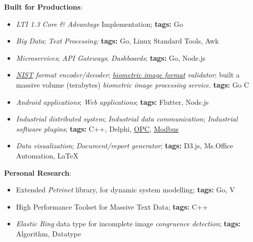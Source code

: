 \documentclass[12pt]{res} %
\begin{document}
\begin{resume}
\begin{multicols}{2}
	\vspace{8pt} %
	\textbf{Built for Productions}:
	\begin{itemize}
		\item \emph{LTI 1.3 Core \& Advantage} Implementation; 
		{\footnotesize \textbf{tags:} Go}
		\item \emph{Big Data}; \emph{Text Processing;}
		{\footnotesize \textbf{tags:} Go, Linux Standard Tools, Awk}
		\item \emph{Microservices}; \emph{API Gateways}; \emph{Dashboards};
		{\footnotesize \textbf{tags:} Go, Node.js}
		\item \emph{\href{https://www.nist.gov/services-resources/software/nist-biometric-image-software-nbis}{NIST} format encoder/decoder}; \emph{\href{https://www.nist.gov/system/files/documents/itl/ansi/sp500-245-a16.pdf} {biometric image format} validator}; built a massive volume (terabytes) \emph{biometric image processing service}. {\footnotesize \textbf{tags:} Go C}
		\item \emph{Android applications}; \emph{Web applications};
		{\footnotesize \textbf{tags:} Flutter, Node.js}
		\item \emph{Industrial distributed system}; \emph{Industrial data communication}; \emph{Industrial software plugins};
		{\footnotesize \textbf{tags:} C++, Delphi, \href{https://opcfoundation.org}{OPC}, \href{https://modbus.org}{Modbus}}
		\item \emph{Data visualization}; \emph{Document/report generator};
		{\footnotesize \textbf{tags:} D3.js}, Ms.Office Automation, \LaTeX
	\end{itemize}
	\textbf{Personal Research}:
	\begin{itemize}
		\item Extended \emph{Petrinet} library, for dynamic system modelling; {\footnotesize \textbf{tags:} Go, V}
		\item High Performance Toolset for Massive Text Data; {\footnotesize \textbf{tags:} C++}
		\item \emph{Elastic Ring} data type for incomplete image \emph{congruence detection}; {\footnotesize \textbf{tags:} Algorithm, Datatype}
	\end{itemize}
\end{multicols}



\end{resume}
\end{document}
